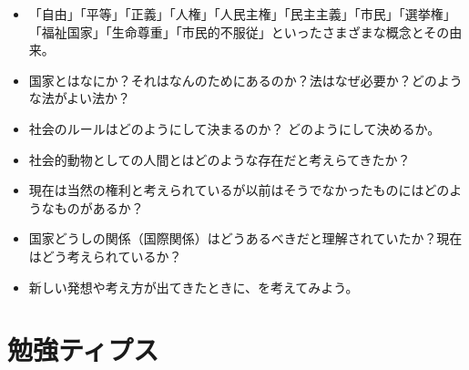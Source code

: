 \documentclass[autodetect-engine,dvipdfmx-if-dvi,ja=standard]{bxjsarticle} \usepackage{mystyle}
\begin{document}
\begin{itemize}
\item 「自由」「平等」「正義」「人権」「人民主権」「民主主義」「市民」「選挙権」「福祉国家」「生命尊重」「市民的不服従」といったさまざまな概念とその由来。
\item 国家とはなにか？それはなんのためにあるのか？法はなぜ必要か？どのような法がよい法か？

\item 社会のルールはどのようにして決まるのか？ どのようにして決めるか。

\item 社会的動物としての人間とはどのような存在だと考えらてきたか？

\item 現在は当然の権利と考えられているが以前はそうでなかったものにはどのようなものがあるか？

\item 国家どうしの関係（国際関係）はどうあるべきだと理解されていたか？現在はどう考えられているか？

\item 新しい発想や考え方が出てきたときに、を考えてみよう。

\end{itemize}






\section*{勉強ティプス}
\end{document}

